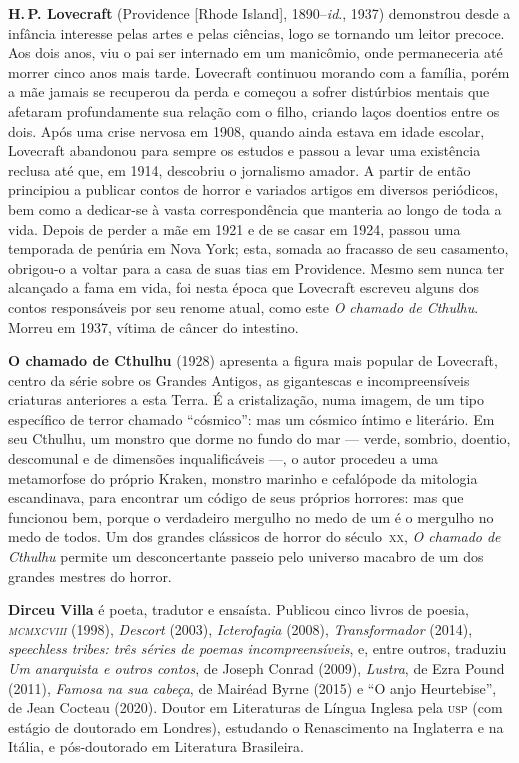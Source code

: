 \textbf{H.\,P. Lovecraft} (Providence [Rhode Island], 1890--\emph{id}., 1937) demonstrou desde a infância interesse pelas artes e
pelas ciências, logo se tornando um leitor precoce. Aos dois anos, viu o pai ser internado em um manicômio, onde permaneceria até
morrer cinco anos mais tarde. Lovecraft continuou morando com a família,
porém a mãe jamais se recuperou da perda e começou a sofrer 
distúrbios mentais que afetaram profundamente sua relação com o filho,
criando laços doentios entre os dois. Após uma crise nervosa em 1908,
quando ainda estava em idade escolar, Lovecraft abandonou para sempre os
estudos e passou a levar uma existência reclusa até que, em 1914,
descobriu o jornalismo amador. A partir de então principiou a publicar
contos de horror e variados artigos em diversos periódicos, bem como a dedicar-se à vasta
correspondência que manteria ao longo de toda a vida.
Depois de perder a mãe em 1921 e de se casar em 1924, passou uma temporada
de penúria em Nova York; esta, somada ao fracasso de seu casamento,
obrigou-o a voltar para a casa de suas tias em Providence.
Mesmo sem nunca ter alcançado a fama em vida, foi nesta época que
Lovecraft escreveu alguns dos contos responsáveis por seu renome atual,
como este \emph{O chamado de Cthulhu}.
Morreu em 1937, vítima de câncer do intestino.

\textbf{O chamado de Cthulhu} (1928) apresenta a figura mais popular de Lovecraft, 
centro da série sobre os Grandes Antigos, as gigantescas e incompreensíveis criaturas 
anteriores a esta Terra. É a cristalização, numa imagem, de um tipo específico de 
terror chamado ``cósmico'': mas um cósmico íntimo e literário. Em seu Cthulhu, um 
monstro que dorme no fundo do mar --- verde, sombrio, doentio, descomunal e de 
dimensões inqualificáveis ---, o autor procedeu a uma metamorfose do próprio Kraken, 
monstro marinho e cefalópode da mitologia escandinava, para encontrar um código de 
seus próprios horrores: mas que funcionou bem, porque o verdadeiro mergulho no medo 
de um é o mergulho no medo de todos. Um dos grandes clássicos de horror do século~\textsc{xx}, \textit{O chamado de Cthulhu} permite um desconcertante passeio pelo 
universo macabro de um dos grandes mestres do horror.

 
\textbf{Dirceu Villa} é poeta, tradutor e ensaísta. Publicou cinco livros de poesia, 
\emph{\textsc{mcmxcviii}} (1998), \emph{Descort} (2003), \emph{Icterofagia} (2008), 
\emph{Transformador} (2014), \emph{speechless tribes: três séries de poemas 
incompreensíveis}, e, entre outros, traduziu \emph{Um anarquista e outros contos}, 
de Joseph Conrad (2009), \emph{Lustra}, de Ezra Pound (2011), 
\emph{Famosa na sua cabeça}, de Mairéad Byrne (2015) e ``O anjo Heurtebise'', de 
Jean Cocteau (2020). Doutor em Literaturas de Língua Inglesa pela \textsc{usp} 
(com estágio de doutorado em Londres), estudando o Renascimento na Inglaterra e na 
Itália, e pós-doutorado em Literatura Brasileira.

